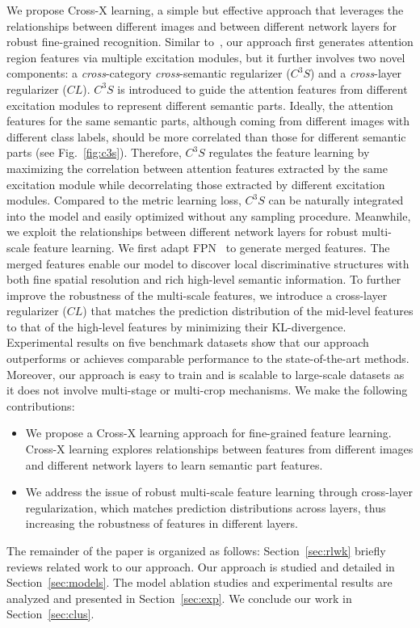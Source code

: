 \documentclass[10pt,twocolumn,letterpaper]{article}
\begin{document}
We propose Cross-X learning, a simple but effective approach that leverages the relationships between different images and between different network layers for robust fine-grained recognition.
Similar to~\cite{mamc18eccv}, our approach first generates attention region features via multiple excitation modules, but it further involves two novel components: a \textit{cross}-category \textit{cross}-semantic regularizer ($C^3S$) and a \textit{cross}-layer regularizer ($CL$).
$C^3S$ is introduced to guide the attention features from different excitation modules to represent different semantic parts.
Ideally, the attention features for the same semantic parts, although coming from different images with different class labels, should be more correlated than those for different semantic parts (see Fig.~\ref{fig:c3s}).
Therefore, $C^3S$ regulates the feature learning by maximizing the correlation between attention features extracted by the same excitation module while decorrelating those extracted by different excitation modules.
Compared to the metric learning loss, $C^3S$ can be naturally integrated into the model and easily optimized without any sampling procedure.
Meanwhile, we exploit the relationships between different network layers for robust multi-scale feature learning. We first adapt FPN~\cite{fpn17kaiming} to generate merged features. The merged features enable our model to discover local discriminative structures with both fine spatial resolution and rich high-level semantic information. To further improve the robustness of the multi-scale features, we introduce a cross-layer regularizer ($CL$) that matches the prediction distribution of the mid-level features to that of the high-level features by minimizing their KL-divergence.
Experimental results on five benchmark datasets show that our approach outperforms or achieves comparable performance to the state-of-the-art methods. Moreover, our approach is easy to train and is scalable to large-scale datasets as it does not involve multi-stage or multi-crop mechanisms.
We make the following contributions:
\begin{itemize}
\item We propose a Cross-X learning approach for fine-grained feature learning. Cross-X learning explores relationships between features from different images and different network layers to learn semantic part features.
\item We address the issue of robust multi-scale feature learning through cross-layer regularization, which matches prediction distributions across layers, thus increasing the robustness of features in different layers.
\end{itemize}
The remainder of the paper is organized as follows: Section~\ref{sec:rlwk} briefly reviews related work to our approach. Our approach is studied and detailed in Section~\ref{sec:models}. The model ablation studies and experimental results are analyzed and presented in Section~\ref{sec:exp}. We conclude our work in Section~\ref{sec:clus}.
\end{document}
